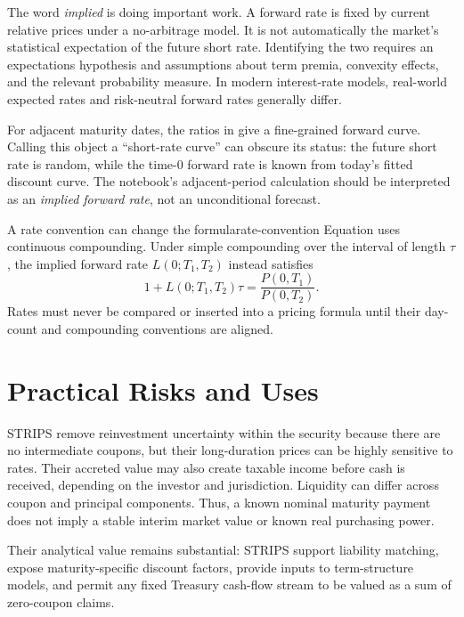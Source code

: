 \documentclass[11pt]{article}
\begin{document}
The word \emph{implied} is doing important work. A forward rate is fixed by current relative prices under a no-arbitrage model. It is not automatically the market's statistical expectation of the future short rate. Identifying the two requires an expectations hypothesis and assumptions about term premia, convexity effects, and the relevant probability measure. In modern interest-rate models, real-world expected rates and risk-neutral forward rates generally differ.

For adjacent maturity dates, the ratios in  give a fine-grained forward curve. Calling this object a ``short-rate curve'' can obscure its status: the future short rate is random, while the time-0 forward rate is known from today's fitted discount curve. The notebook's adjacent-period calculation should be interpreted as an \emph{implied forward rate}, not an unconditional forecast.

\begin{remark}{A rate convention can change the formula}{rate-convention}
Equation  uses continuous compounding. Under simple compounding over the interval of length $\tau$, the implied forward rate $L(0;T_1,T_2)$ instead satisfies
\begin{equation}
  \label{eq:simple-forward}
  1+L(0;T_1,T_2)\tau=\frac{P(0,T_1)}{P(0,T_2)}.
\end{equation}
Rates must never be compared or inserted into a pricing formula until their day-count and compounding conventions are aligned.
\end{remark}

\section{Practical Risks and Uses}

STRIPS remove reinvestment uncertainty within the security because there are no intermediate coupons, but their long-duration prices can be highly sensitive to rates. Their accreted value may also create taxable income before cash is received, depending on the investor and jurisdiction. Liquidity can differ across coupon and principal components. Thus, a known nominal maturity payment does not imply a stable interim market value or known real purchasing power.

Their analytical value remains substantial: STRIPS support liability matching, expose maturity-specific discount factors, provide inputs to term-structure models, and permit any fixed Treasury cash-flow stream to be valued as a sum of zero-coupon claims.
\end{document}
